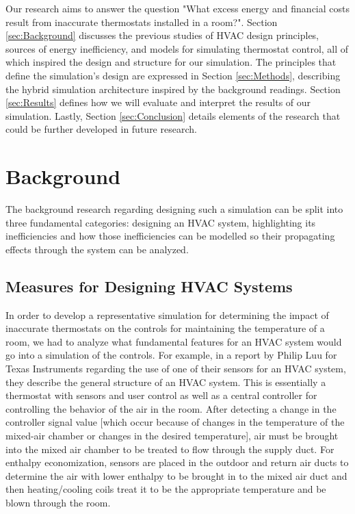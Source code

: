\documentclass[conference,letterpaper]{IEEEtran}
\begin{document}
Our research aims to answer the question "What excess energy and financial costs result from inaccurate thermostats installed in a room?".  Section \ref{sec:Background} discusses the previous studies of HVAC design principles, sources of energy inefficiency, and models for simulating thermostat control, all of which inspired the design and structure for our simulation. The principles that define the simulation's design are expressed in Section \ref{sec:Methods}, describing the hybrid simulation architecture inspired by the background readings. Section \ref{sec:Results} defines how we will evaluate and interpret the results of our simulation. Lastly, Section \ref{sec:Conclusion} details elements of the research that could be further developed in future research.

\section{Background}
The background research regarding designing such a simulation can be split into three fundamental categories: designing an HVAC system, highlighting its inefficiencies and how those inefficiencies can be modelled so their propagating effects through the system can be analyzed.
\label{sec:Background}
\subsection{Measures for Designing HVAC Systems}
In order to develop a representative simulation for determining the impact of inaccurate thermostats on the controls for maintaining the temperature of a room, we had to analyze what fundamental features for an HVAC system would go into a simulation of the controls. For example, in a report by Philip Luu for Texas Instruments \cite{Luu2021} regarding the use of one of their sensors for an HVAC system, they describe the general structure of an HVAC system. This is essentially a thermostat with sensors and user control as well as a central controller for controlling the behavior of the air in the room. After detecting a change in the controller signal value [which occur because of changes in the temperature of the mixed-air chamber or changes in the desired temperature], air must be brought into the mixed air chamber to be treated to flow through the supply duct. For enthalpy economization, sensors are placed in the outdoor and return air ducts to determine the air with lower enthalpy to be brought in to the mixed air duct and then heating/cooling coils treat it to be the appropriate temperature and be blown through the room. 
\end{document}
